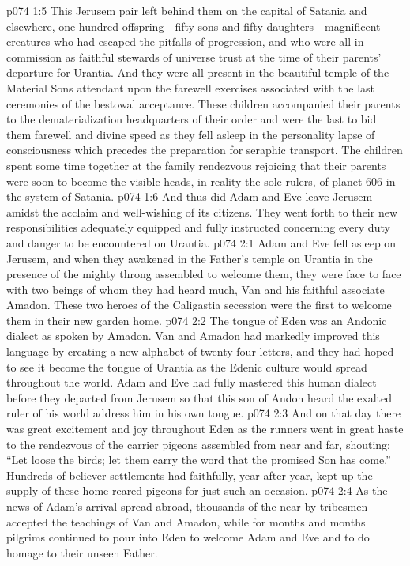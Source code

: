 \pc \vs p074 1:5 This Jerusem pair left behind them on the capital of Satania and elsewhere, one hundred offspring---fifty sons and fifty daughters---magnificent creatures who had escaped the pitfalls of progression, and who were all in commission as faithful stewards of universe trust at the time of their parents’ departure for Urantia. And they were all present in the beautiful temple of the Material Sons attendant upon the farewell exercises associated with the last ceremonies of the bestowal acceptance. These children accompanied their parents to the dematerialization headquarters of their order and were the last to bid them farewell and divine speed as they fell asleep in the personality lapse of consciousness which precedes the preparation for seraphic transport. The children spent some time together at the family rendezvous rejoicing that their parents were soon to become the visible heads, in reality the sole rulers, of planet 606 in the system of Satania.
\vs p074 1:6 And thus did Adam and Eve leave Jerusem amidst the acclaim and well\hyp{}wishing of its citizens. They went forth to their new responsibilities adequately equipped and fully instructed concerning every duty and danger to be encountered on Urantia.
\vs p074 2:1 Adam and Eve fell asleep on Jerusem, and when they awakened in the Father’s temple on Urantia in the presence of the mighty throng assembled to welcome them, they were face to face with two beings of whom they had heard much, Van and his faithful associate Amadon. These two heroes of the Caligastia secession were the first to welcome them in their new garden home.
\vs p074 2:2 The tongue of Eden was an Andonic dialect as spoken by Amadon. Van and Amadon had markedly improved this language by creating a new alphabet of twenty\hyp{}four letters, and they had hoped to see it become the tongue of Urantia as the Edenic culture would spread throughout the world. Adam and Eve had fully mastered this human dialect before they departed from Jerusem so that this son of Andon heard the exalted ruler of his world address him in his own tongue.
\vs p074 2:3 And on that day there was great excitement and joy throughout Eden as the runners went in great haste to the rendezvous of the carrier pigeons assembled from near and far, shouting: “Let loose the birds; let them carry the word that the promised Son has come.” Hundreds of believer settlements had faithfully, year after year, kept up the supply of these home\hyp{}reared pigeons for just such an occasion.
\pc \vs p074 2:4 As the news of Adam’s arrival spread abroad, thousands of the near\hyp{}by tribesmen accepted the teachings of Van and Amadon, while for months and months pilgrims continued to pour into Eden to welcome Adam and Eve and to do homage to their unseen Father.
